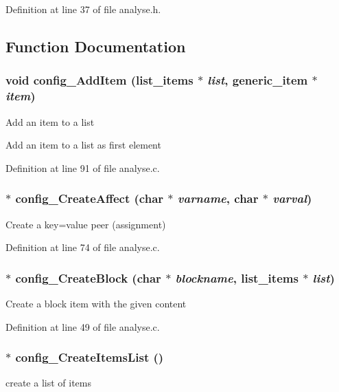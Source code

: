 Definition at line 37 of file analyse.h.

\subsection{Function Documentation}
\subsubsection[{config\_\-AddItem}]{\setlength{\rightskip}{0pt plus 5cm}void config\_\-AddItem ({\bf list\_\-items} $\ast$ {\em list}, \/  {\bf generic\_\-item} $\ast$ {\em item})}\label{analyse_8h_a4f7005314a823e91e222533981b18286}
Add an item to a list

Add an item to a list as first element 

Definition at line 91 of file analyse.c.
\subsubsection[{config\_\-CreateAffect}]{$\ast$ config\_\-CreateAffect (char $\ast$ {\em varname}, \/  char $\ast$ {\em varval})}\label{analyse_8h_a19694ceaab9125cba46213b5f0857676}
Create a key=value peer (assignment) 

Definition at line 74 of file analyse.c.
\subsubsection[{config\_\-CreateBlock}]{$\ast$ config\_\-CreateBlock (char $\ast$ {\em blockname}, \/  {\bf list\_\-items} $\ast$ {\em list})}\label{analyse_8h_abe9e49a5e342b113519db7bcb9ad8ee3}
Create a block item with the given content 

Definition at line 49 of file analyse.c.
\subsubsection[{config\_\-CreateItemsList}]{$\ast$ config\_\-CreateItemsList ()}\label{analyse_8h_ab9e49c47a113c09943b6afebde940857}
create a list of items 

